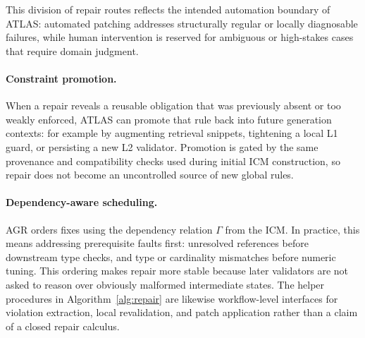 \documentclass[acmlarge,nonacm]{acmart}
\theoremstyle{acmplain}
\theoremstyle{acmdefinition}
\begin{document}
This division of repair routes reflects the intended automation boundary of ATLAS: automated patching addresses structurally regular or locally diagnosable failures, while human intervention is reserved for ambiguous or high-stakes cases that require domain judgment.

\paragraph{Constraint promotion.}
When a repair reveals a reusable obligation that was previously absent or too weakly enforced, ATLAS can promote that rule back into future generation contexts: for example by augmenting retrieval snippets, tightening a local L1 guard, or persisting a new L2 validator. Promotion is gated by the same provenance and compatibility checks used during initial ICM construction, so repair does not become an uncontrolled source of new global rules.

\paragraph{Dependency-aware scheduling.}
AGR orders fixes using the dependency relation $\Gamma$ from the ICM. In practice, this means addressing prerequisite faults first: unresolved references before downstream type checks, and type or cardinality mismatches before numeric tuning. This ordering makes repair more stable because later validators are not asked to reason over obviously malformed intermediate states. The helper procedures in Algorithm~\ref{alg:repair} are likewise workflow-level interfaces for violation extraction, local revalidation, and patch application rather than a claim of a closed repair calculus.
\end{document}
